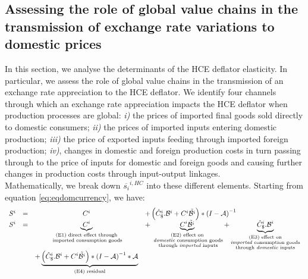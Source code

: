 \documentclass[11pt,a4paper]{paper} %
\begin{document}
\subsection{Assessing the role of global value chains in the transmission of exchange rate variations to domestic prices}
In this section, we analyse the determinants of the HCE deflator elasticity. 
In particular, we assess the role of global value chains in the transmission of an exchange rate appreciation to the HCE deflator. 
We identify four channels through which an exchange rate appreciation impacts the HCE deflator when production processes are global: \textit{i)} the prices of imported ﬁnal goods sold directly to domestic consumers;
\textit{ii)} the prices of imported inputs entering domestic production; 
\textit{iii)} the price of exported inputs feeding through imported foreign production;
\textit{iv)}, changes in domestic and foreign production costs in turn passing through to the price of inputs for domestic and foreign goods and causing further changes in production costs through input-output linkages.\\
Mathematically, we break down $\overline{s_{i}}^{i,HC}$ into these different elements.
Starting from equation \ref{eq:eqdomcurrency}, we have:
\begin{equation}
\begin{array}{lccl}
	S^ i&=&C^i	&+ \left(\hat{C}^i_\$.{\cal B}^i+{C^i}{\tilde{{\cal B}^i}}\right)*{{(I-{\cal A})}^{-1}} \\
	S^i &=&\underbrace{C^i}_{\substack{\text{(E1) direct effect through} \\ \text{ imported consumption goods}}}&+ \underbrace{{C^i}{\tilde{{\cal B}^i}}}_{\substack{\text{(E2) effect on} \\ \text{ \emph{domestic} consumption goods} \\ \text{ through \emph{imported} inputs}}}  + \underbrace{\hat{C}^i_\$.{\cal B}^i}_{\substack{\text{(E3)  effect on} \\ \text{\emph{imported} consumption goods} \\ \text{through \emph{domestic} inputs}}} \\ &&+\underbrace {\left( \hat{C}^i_\$.{\cal B}^i + {C^i}{\tilde{{\cal B}^i}}\right)*{{(I-{\cal A})}^{-1}}*{\cal A}}_{\text{(E4) residual}} \\
\end{array}
\label{eq:decomp}
\end{equation}
\end{document}
